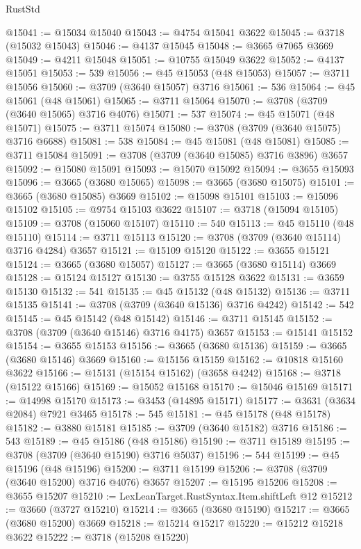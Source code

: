 \begin{lexlean}{RustStd}
\begin{coremodule}
@15041 := @15034 @15040
@15043 := @4754 @15041 @3622
@15045 := @3718 (@15032 @15043)
@15046 := @4137 @15045
@15048 := @3665 @7065 @3669
@15049 := @4211 @15048
@15051 := @10755 @15049 @3622
@15052 := @4137 @15051
@15053 := 539
@15056 := @45 @15053 (@48 @15053)
@15057 := @3711 @15056
@15060 := @3709 (@3640 @15057) @3716
@15061 := 536
@15064 := @45 @15061 (@48 @15061)
@15065 := @3711 @15064
@15070 := @3708 (@3709 (@3640 @15065) @3716 @4076)
@15071 := 537
@15074 := @45 @15071 (@48 @15071)
@15075 := @3711 @15074
@15080 := @3708 (@3709 (@3640 @15075) @3716 @6688)
@15081 := 538
@15084 := @45 @15081 (@48 @15081)
@15085 := @3711 @15084
@15091 := @3708 (@3709 (@3640 @15085) @3716 @3896) @3657
@15092 := @15080 @15091
@15093 := @15070 @15092
@15094 := @3655 @15093
@15096 := @3665 (@3680 @15065)
@15098 := @3665 (@3680 @15075)
@15101 := @3665 (@3680 @15085) @3669
@15102 := @15098 @15101
@15103 := @15096 @15102
@15105 := @9754 @15103 @3622
@15107 := @3718 (@15094 @15105)
@15109 := @3708 (@15060 @15107)
@15110 := 540
@15113 := @45 @15110 (@48 @15110)
@15114 := @3711 @15113
@15120 := @3708 (@3709 (@3640 @15114) @3716 @4284) @3657
@15121 := @15109 @15120
@15122 := @3655 @15121
@15124 := @3665 (@3680 @15057)
@15127 := @3665 (@3680 @15114) @3669
@15128 := @15124 @15127
@15130 := @3755 @15128 @3622
@15131 := @3659 @15130
@15132 := 541
@15135 := @45 @15132 (@48 @15132)
@15136 := @3711 @15135
@15141 := @3708 (@3709 (@3640 @15136) @3716 @4242)
@15142 := 542
@15145 := @45 @15142 (@48 @15142)
@15146 := @3711 @15145
@15152 := @3708 (@3709 (@3640 @15146) @3716 @4175) @3657
@15153 := @15141 @15152
@15154 := @3655 @15153
@15156 := @3665 (@3680 @15136)
@15159 := @3665 (@3680 @15146) @3669
@15160 := @15156 @15159
@15162 := @10818 @15160 @3622
@15166 := @15131 (@15154 @15162) (@3658 @4242)
@15168 := @3718 (@15122 @15166)
@15169 := @15052 @15168
@15170 := @15046 @15169
@15171 := @14998 @15170
@15173 := @3453 (@14895 @15171)
@15177 := @3631 (@3634 @2084) @7921 @3465
@15178 := 545
@15181 := @45 @15178 (@48 @15178)
@15182 := @3880 @15181
@15185 := @3709 (@3640 @15182) @3716
@15186 := 543
@15189 := @45 @15186 (@48 @15186)
@15190 := @3711 @15189
@15195 := @3708 (@3709 (@3640 @15190) @3716 @5037)
@15196 := 544
@15199 := @45 @15196 (@48 @15196)
@15200 := @3711 @15199
@15206 := @3708 (@3709 (@3640 @15200) @3716 @4076) @3657
@15207 := @15195 @15206
@15208 := @3655 @15207
@15210 := LexLeanTarget.RustSyntax.Item.shiftLeft @12
@15212 := @3660 (@3727 @15210)
@15214 := @3665 (@3680 @15190)
@15217 := @3665 (@3680 @15200) @3669
@15218 := @15214 @15217
@15220 := @15212 @15218 @3622
@15222 := @3718 (@15208 @15220)

\end{coremodule}
\end{lexlean}
